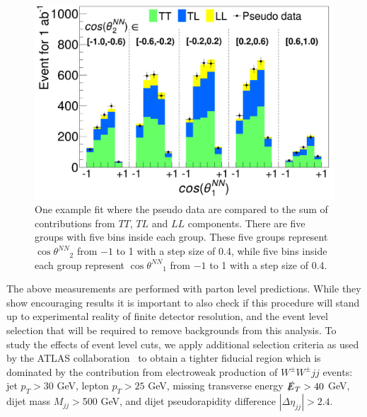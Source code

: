 \documentclass[aps,prl,twocolumn,showpacs,superscriptaddress,groupeaddress,floatfix]{revtex4}
\def\ssWW{\ensuremath{ W^{\pm}W^{\pm}jj }\xspace}
\def\tsNN{\ensuremath{ \theta^{NN} }\xspace}
\def\ctsNN{\ensuremath{ \cos\tsNN }\xspace}
\begin{document}
\begin{figure}[h]

\includegraphics[width=.45\textwidth,height=.18\textheight]{fig_03.pdf}


\caption{\label{fig:fit_example} One example fit where the pseudo data are compared to the sum of 
contributions from $TT$, $TL$ and $LL$ components. There are five groups with five bins inside each group. 
These five groups represent $\ctsNN_2$ from $-1$ to 1 with a step size of 0.4, while five bins inside each group represent $\ctsNN_1$ from $-1$ to 1 with a step size of 0.4. }
\end{figure}

The above measurements are performed with parton level predictions. While they show encouraging results  it is important 
to also check if this procedure will stand up to experimental reality of finite detector resolution, and the event level selection that
will be required to remove backgrounds from this analysis. To study the effects of event level cuts, we apply additional selection criteria as used by the ATLAS collaboration~\cite{ATLAS_ssWW} to obtain a
tighter fiducial region which is dominated by the contribution from electroweak production of \ssWW events: jet $p_T > 30$ GeV, lepton $p_T > 25$ GeV, missing transverse energy $\slashed{E}_T > 40$ GeV, 
dijet mass $M_{jj} > $500 GeV, and dijet pseudorapidity difference $|\Delta \eta_{jj}| > 2.4 $. 
\end{document}
